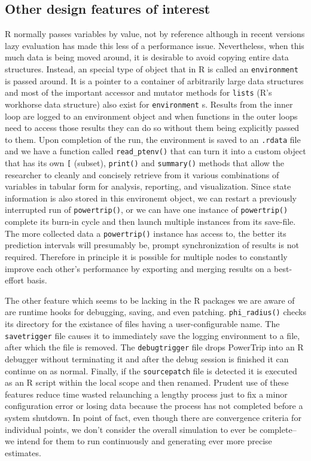 \documentclass[review, authoryear]{elsarticle}
\begin{document}
\subsection{Other design features of
interest}\label{other-design-features-of-interest}

R normally passes variables by value, not by reference although in
recent versions lazy evaluation has made this less of a performance
issue. Nevertheless, when this much data is being moved around, it is
desirable to avoid copying entire data structures. Instead, an special
type of object that in R is called an \texttt{environment} is passed
around. It is a pointer to a container of arbitrarily large data
structures and most of the important accessor and mutator methods for
\texttt{lists} (R's workhorse data structure) also exist for
\texttt{environment} s. Results from the inner loop are logged to an
environment object and when functions in the outer loops need to access
those results they can do so without them being explicitly passed to
them. Upon completion of the run, the environment is saved to an
\texttt{.rdata} file and we have a function called
\texttt{read\_ptenv()} that can turn it into a custom object that has
its own \texttt{{[}} (subset), \texttt{print()} and \texttt{summary()}
methods that allow the researcher to cleanly and concisely retrieve from
it various combinations of variables in tabular form for analysis,
reporting, and visualization. Since state information is also stored in
this environemt object, we can restart a previously interrupted run of
\texttt{powertrip()}, or we can have one instance of
\texttt{powertrip()} complete its burn-in cycle and then launch multiple
instances from its save-file. The more collected data a
\texttt{powertrip()} instance has access to, the better its prediction
intervals will presumably be, prompt synchronization of results is not
required. Therefore in principle it is possible for multiple nodes to
constantly improve each other's performance by exporting and merging
results on a best-effort basis.

The other feature which seems to be lacking in the R packages we are
aware of are runtime hooks for debugging, saving, and even patching.
\texttt{phi\_radius()} checks its directory for the existance of files
having a user-configurable name. The \texttt{savetrigger} file causes it
to immediately save the logging environment to a file, after which the
file is removed. The \texttt{debugtrigger} file drops PowerTrip into an
R debugger without terminating it and after the debug session is
finished it can continue on as normal. Finally, if the
\texttt{sourcepatch} file is detected it is executed as an R script
within the local scope and then renamed. Prudent use of these features
reduce time wasted relaunching a lengthy process just to fix a minor
configuration error or losing data because the process has not completed
before a system shutdown. In point of fact, even though there are
convergence criteria for individual points, we don't consider the
overall simulation to ever be complete-- we intend for them to run
continuously and generating ever more precise estimates.
\end{document}
